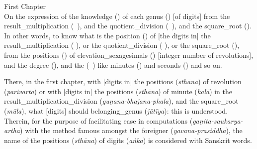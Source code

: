 \begin{multicols}{2}
First Chapter\\
On the expression of the \gls{knowledge} (\marifat) of each \gls{genus} (\jins) [of digits] from the \gls{result_multiplication} (\hasil\idafaconsonant\ \darb), and the \gls{quotient_division} (\kharij\idafaconsonant\ \qismat), and the \gls{square_root} (\jadr). In other words, to know what is the \gls{position} (\martaba) of [the digits in] the \gls{result_multiplication} (\mbox{\hasil\idafaconsonant} \darb), or the \gls{quotient_division} (\mbox{\kharij\idafaconsonant} \qismat), or the \gls{square_root} (\jadr), from the \glspl{position} (\maratib) of \glspl{elevation_sexagesimal} (\marfuat) [\scl integer number of revolutions], and the \gls{degree} (\daraj), and the  (\ajza\idafaconsonant\ \daraj) like \glspl{minute} (\daqaiq) and \glspl{second} (\thawani) and so on.
\columnbreak

There, in the first chapter, with [digits in] the \glspl{position} (\textit{sthāna}) of \gls{revolution} (\textit{parivarta}) \etc or with [digits in] the \glspl{position} (\textit{sthāna}) of \gls{minute} (\textit{kalā}) \etc in the \gls{result_multiplication_division} (\textit{guṇana-bhajana-phala}), and the \gls{square_root} (\textit{mūla}), what [digits] should \gls{belonging_genus} (\textit{jātīya}): this is understood. Therein, for the purpose of facilitating ease in computations (\textit{gaṇita-saukarya-artha}) with the method famous amongst the foreigner (\textit{yavana-prasiddha}), the name of the \glspl{position} (\textit{sthāna}) of \glspl{digit} (\textit{aṅka}) is considered with Sanskrit words.
\end{multicols}
\medskip

\newpage %


